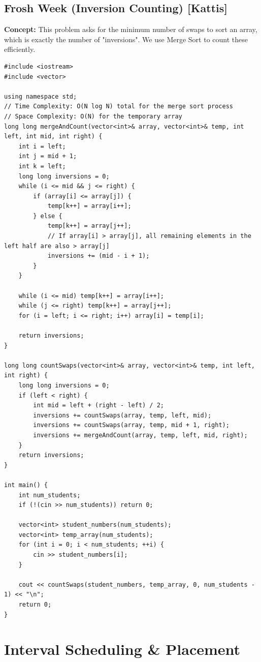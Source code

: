 \subsection{Frosh Week (Inversion Counting) [Kattis]}
\textbf{Concept:} This problem asks for the minimum number of swaps to sort an array, which is exactly the number of "inversions". We use Merge Sort to count these efficiently.
\begin{lstlisting}
#include <iostream>
#include <vector>

using namespace std;
// Time Complexity: O(N log N) total for the merge sort process
// Space Complexity: O(N) for the temporary array
long long mergeAndCount(vector<int>& array, vector<int>& temp, int left, int mid, int right) {
    int i = left;
    int j = mid + 1;
    int k = left;
    long long inversions = 0;
    while (i <= mid && j <= right) {
        if (array[i] <= array[j]) {
            temp[k++] = array[i++];
        } else {
            temp[k++] = array[j++];
            // If array[i] > array[j], all remaining elements in the left half are also > array[j]
            inversions += (mid - i + 1);
        }
    }

    while (i <= mid) temp[k++] = array[i++];
    while (j <= right) temp[k++] = array[j++];
    for (i = left; i <= right; i++) array[i] = temp[i];

    return inversions;
}

long long countSwaps(vector<int>& array, vector<int>& temp, int left, int right) {
    long long inversions = 0;
    if (left < right) {
        int mid = left + (right - left) / 2;
        inversions += countSwaps(array, temp, left, mid);
        inversions += countSwaps(array, temp, mid + 1, right);
        inversions += mergeAndCount(array, temp, left, mid, right);
    }
    return inversions;
}

int main() {
    int num_students;
    if (!(cin >> num_students)) return 0;

    vector<int> student_numbers(num_students);
    vector<int> temp_array(num_students);
    for (int i = 0; i < num_students; ++i) {
        cin >> student_numbers[i];
    }

    cout << countSwaps(student_numbers, temp_array, 0, num_students - 1) << "\n";
    return 0;
}
\end{lstlisting}


\section{Interval Scheduling \& Placement}

